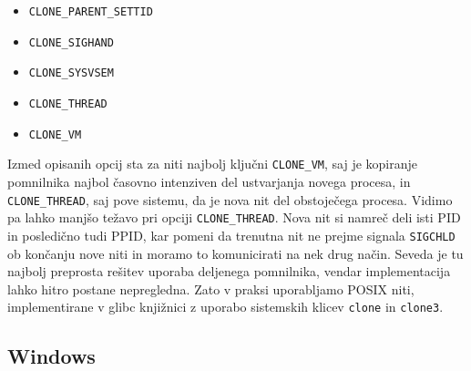 \documentclass[a4paper,12pt,openright]{book}
\begin{document}
\begin{itemize}
\begin{description}
	      \end{description}
	\item \texttt{CLONE\_PARENT\_SETTID}
	\item \texttt{CLONE\_SIGHAND}
	\item \texttt{CLONE\_SYSVSEM}
	\item \texttt{CLONE\_THREAD}
	\item \texttt{CLONE\_VM}
\end{itemize}

Izmed opisanih opcij sta za niti najbolj ključni \texttt{CLONE\_VM}, saj je kopiranje pomnilnika najbol časovno intenziven del ustvarjanja novega procesa, in \texttt{CLONE\_THREAD}, saj pove sistemu, da je nova nit del obstoječega procesa.
Vidimo pa lahko manjšo težavo pri opciji \texttt{CLONE\_THREAD}.
Nova nit si namreč deli isti PID in posledično tudi PPID, kar pomeni da trenutna nit ne prejme signala \texttt{SIGCHLD} ob končanju nove niti in moramo to komunicirati na nek drug način.
Seveda je tu najbolj preprosta rešitev uporaba deljenega pomnilnika, vendar implementacija lahko hitro postane nepregledna.
Zato v praksi uporabljamo POSIX niti, implementirane v glibc knjižnici z uporabo sistemskih klicev \texttt{clone} in \texttt{clone3}.

\subsection{Windows}
\end{document}
